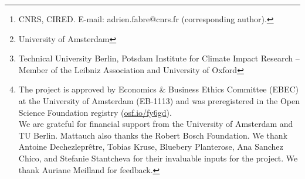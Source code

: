 \author{Adrien Fabre\footnote{CNRS, CIRED. E-mail: adrien.fabre@cnrs.fr (corresponding author).}, Thomas Douenne\footnote{University of Amsterdam}\; and Linus Mattauch\footnote{Technical University Berlin, Potsdam Institute for Climate Impact Research -- Member of the Leibniz Association and University of Oxford}~~\thanks{The project is approved by Economics \& Business Ethics Committee (EBEC) at the University of Amsterdam (EB-1113) and %
was preregistered in the Open Science Foundation registry (\href{https://osf.io/fy6gd}{osf.io/fy6gd}). \\ We are grateful for financial support from the University of Amsterdam and TU Berlin. Mattauch also thanks the Robert Bosch Foundation. %
We thank Antoine Dechezleprêtre, Tobias Kruse, Bluebery Planterose, Ana Sanchez Chico, and Stefanie Stantcheva for their invaluable inputs for the project. We thank Auriane Meilland for feedback. %
}} %

\date{\today} %



\maketitle

\begin{center}
\end{center}



